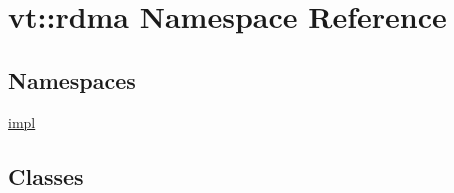 \hypertarget{namespacevt_1_1rdma}{}\section{vt\+:\+:rdma Namespace Reference}
\label{namespacevt_1_1rdma}
\subsection*{Namespaces}
\begin{DoxyCompactItemize}
\item 
 \hyperlink{namespacevt_1_1rdma_1_1impl}{impl}
\end{DoxyCompactItemize}
\subsection*{Classes}
